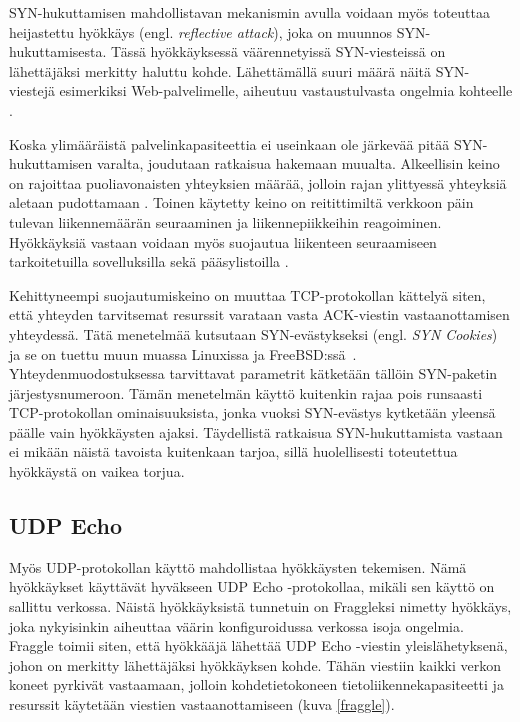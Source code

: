 SYN-hukuttamisen mahdollistavan mekanismin avulla voidaan myös toteuttaa
heijastettu hyökkäys (engl. \textit{reflective attack}), joka on muunnos 
SYN-hukuttamisesta. Tässä hyökkäyksessä väärennetyissä SYN-viesteissä on
lähettäjäksi merkitty haluttu kohde. Lähettämällä suuri määrä näitä SYN-viestejä 
esimerkiksi Web-\-palvelimelle, aiheutuu vastaustulvasta ongelmia
kohteelle \cite{STACK}.

Koska ylimääräistä palvelinkapasiteettia ei useinkaan ole järkevää
pitää SYN-hukuttamisen varalta, joudutaan ratkaisua
hakemaan muualta. Alkeellisin keino on rajoittaa puoliavonaisten
yhteyksien määrää, jolloin rajan ylittyessä yhteyksiä aletaan
pudottamaan \cite{TCP}. Toinen käytetty keino on reitittimiltä
verkkoon päin tulevan liikennemäärän seuraaminen ja liikennepiikkeihin
reagoiminen. Hyökkäyksiä vastaan voidaan myös suojautua liikenteen
seuraamiseen tarkoitetuilla sovelluksilla sekä pääsylistoilla
\cite{STACK}.

Kehittyneempi suojautumiskeino on muuttaa TCP-protokollan kättelyä
siten, että yhteyden tarvitsemat resurssit varataan vasta ACK-viestin
vastaanottamisen yhteydessä. Tätä menetelmää kutsutaan
SYN-evästykseksi (engl. \textit{SYN Cookies}) ja se on tuettu
muun muassa Linuxissa ja FreeBSD:ssä~\cite{syncookies}. Yhteydenmuodostuksessa
tarvittavat parametrit kätketään tällöin SYN-paketin
järjestysnumeroon. Tämän menetelmän käyttö kuitenkin rajaa pois
runsaasti TCP-protokollan ominaisuuksista, jonka vuoksi SYN-evästys
kytketään yleensä päälle vain hyökkäysten ajaksi.
Täydellistä ratkaisua SYN-hukuttamista vastaan ei mikään näistä
tavoista kuitenkaan tarjoa, sillä huolellisesti toteutettua hyökkäystä on
vaikea torjua.

\subsection{UDP Echo}

Myös UDP-protokollan käyttö mahdollistaa hyökkäysten tekemisen. Nämä
hyökkäykset käyttävät hyväkseen UDP Echo -protokollaa, mikäli sen
käyttö on sallittu verkossa. Näistä hyökkäyksistä tunnetuin on
Fraggleksi nimetty hyökkäys, joka nykyisinkin aiheuttaa väärin
konfiguroidussa verkossa isoja ongelmia. Fraggle toimii siten, että
hyökkääjä lähettää UDP Echo -viestin yleislähetyksenä, johon on
merkitty lähettäjäksi hyökkäyksen kohde. Tähän viestiin kaikki verkon
koneet pyrkivät vastaamaan, jolloin kohdetietokoneen
tietoliikennekapasiteetti ja resurssit käytetään viestien
vastaanottamiseen (kuva \ref{fraggle}).

